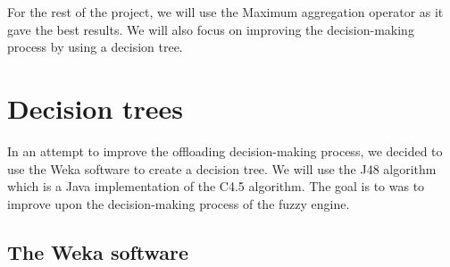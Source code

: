 \begin{table}[H]
  \bigskip

  \centering
  \caption{Sample results from the fuzzy engine with the Bounded sum aggregation operator.}
  \label{tab:fuzzy-results-bounded}
\end{table}

For the rest of the project, we will use the Maximum aggregation operator as it gave the best results. We will also focus
on improving the decision-making process by using a decision tree.

\chapter{Decision trees}
\label{chap:decision-trees}

In an attempt to improve the offloading decision-making process, we decided to use the Weka\cite{weka} software to create
a decision tree. We will use the J48 algorithm which is a Java implementation of the C4.5 algorithm. The goal is to was to
improve upon the decision-making process of the fuzzy engine.

\section{The Weka software}
\label{sec:weka}

